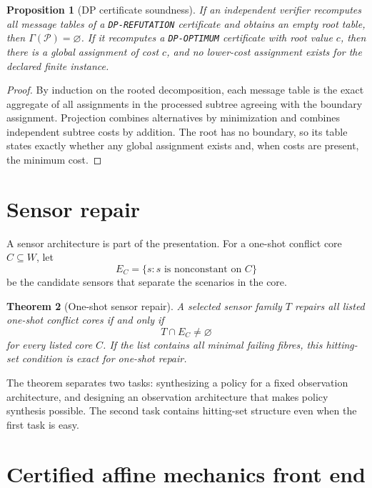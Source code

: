 \documentclass[11pt]{article}
\theoremstyle{plain}
\newtheorem{theorem}{Theorem}[section]
\newtheorem{proposition}[theorem]{Proposition}
\theoremstyle{definition}
\theoremstyle{remark}
\begin{document}
\begin{proposition}[DP certificate soundness]
If an independent verifier recomputes all message tables of a
\texttt{DP-REFUTATION} certificate and obtains an empty root table, then
\(\Gamma(\mathcal P)=\varnothing\).  If it recomputes a \texttt{DP-OPTIMUM}
certificate with root value \(c\), then there is a global assignment of cost
\(c\), and no lower-cost assignment exists for the declared finite instance.
\end{proposition}

\begin{proof}
By induction on the rooted decomposition, each message table is the exact
aggregate of all assignments in the processed subtree agreeing with the boundary
assignment.  Projection combines alternatives by minimization and combines
independent subtree costs by addition.  The root has no boundary, so its table
states exactly whether any global assignment exists and, when costs are present,
the minimum cost.
\end{proof}

\section{Sensor repair}
\label{sec:sensor-repair}

A sensor architecture is part of the presentation.  For a one-shot conflict core
\(C\subseteq W\), let
\[
  E_C=\{s:s\text{ is nonconstant on }C\}
\]
be the candidate sensors that separate the scenarios in the core.

\begin{theorem}[One-shot sensor repair]
A selected sensor family \(T\) repairs all listed one-shot conflict cores if and
only if
\[
  T\cap E_C\ne\varnothing
\]
for every listed core \(C\).  If the list contains all minimal failing fibres,
this hitting-set condition is exact for one-shot repair.
\end{theorem}

The theorem separates two tasks: synthesizing a policy for a fixed observation
architecture, and designing an observation architecture that makes policy
synthesis possible.  The second task contains hitting-set structure even when
the first task is easy.

\section{Certified affine mechanics front end}
\label{sec:mechanics-front-end}
\end{document}
